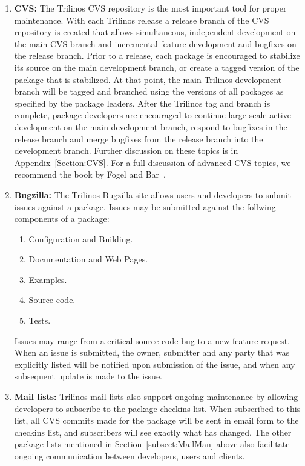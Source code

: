 \documentclass[12pt,strict]{TrilinosDevGuide}
\begin{document}
\begin{enumerate}
\item {\bf CVS:} The Trilinos CVS repository is the most important
tool for proper maintenance.  With each Trilinos release a release
branch of the CVS repository is
created  that allows simultaneous, independent development on the main
CVS branch and incremental feature development and
bugfixes on the release branch.  Prior to a release, each package is
encouraged to stabilize its source on the main development branch, or
create a tagged version of the package that is stabilized.  At that
point, the main Trilinos development branch will be tagged and
branched using the versions of all packages as specified by the
package leaders.  After the Trilinos tag and branch is complete, 
package developers are encouraged to continue large scale active
development on the main development branch, respond to bugfixes in the
release branch and merge bugfixes from the release branch into the
development branch.  Further discussion on these topics is in 
Appendix~\ref{Section:CVS}.  For a full discussion of advanced CVS
topics, we recommend the book by Fogel and Bar~\cite{FogelBarCVS}.

\item {\bf Bugzilla:} The Trilinos Bugzilla site
allows users and developers to submit issues against a package.
Issues may be submitted against the follwing components of a package:
\begin{enumerate}
\item Configuration and Building.
\item Documentation and Web Pages.
\item Examples.
\item Source code.
\item Tests.
\end{enumerate}
Issues may range from a critical source code bug to a new feature
request.  When an issue is submitted, the owner, submitter and any
party that was explicitly listed will be notified upon submission of
the issue, and when any subsequent update is made to the issue.

\item {\bf Mail lists:} 
Trilinos mail lists also support ongoing maintenance by allowing
developers to subscribe to the package checkins list.  When subscribed
to this list, all CVS commits made for the package will be sent in
email form to the checkins list, and subscribers will see exactly what
has changed. The other package lists mentioned in 
Section~\ref{subsect:MailMan} above also facilitate ongoing
communication between developers, users and clients.


\end{enumerate}
\end{document}
